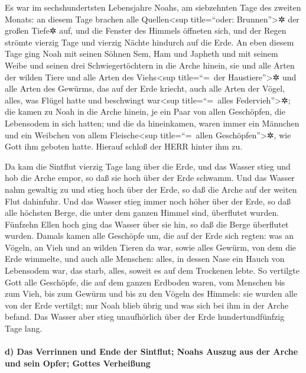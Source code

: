  Es war im sechshundertsten Lebensjahre Noahs, am
siebzehnten Tage des zweiten Monats: an diesem Tage brachen alle
Quellen\textless sup title=``oder: Brunnen''\textgreater✲ der großen
Tiefe✲ auf, und die Fenster des Himmels öffneten sich, 
und der Regen strömte vierzig Tage und vierzig Nächte hindurch auf die
Erde.  An eben diesem Tage ging Noah mit seinen Söhnen
Sem, Ham und Japheth und mit seinem Weibe und seinen drei
Schwiegertöchtern in die Arche hinein,  sie und alle
Arten der wilden Tiere und alle Arten des Viehs\textless sup
title=``=~der Haustiere''\textgreater✲ und alle Arten des Gewürms, das
auf der Erde kriecht, auch alle Arten der Vögel, alles, was Flügel hatte
und beschwingt war\textless sup title=``=~alles
Federvieh''\textgreater✲;  die kamen zu Noah in die Arche
hinein, je ein Paar von allen Geschöpfen, die Lebensodem in sich hatten;
 und die da hineinkamen, waren immer ein Männchen und ein
Weibchen von allem Fleische\textless sup title=``=~allen
Geschöpfen''\textgreater✲, wie Gott ihm geboten hatte. Hierauf schloß
der HERR hinter ihm zu.

 Da kam die Sintflut vierzig Tage lang über die Erde, und
das Wasser stieg und hob die Arche empor, so daß sie hoch über der Erde
schwamm.  Und das Wasser nahm gewaltig zu und stieg hoch
über der Erde, so daß die Arche auf der weiten Flut dahinfuhr.
 Und das Wasser stieg immer noch höher über der Erde, so
daß alle höchsten Berge, die unter dem ganzen Himmel sind, überflutet
wurden.  Fünfzehn Ellen hoch ging das Wasser über sie
hin, so daß die Berge überflutet wurden.  Damals kamen
alle Geschöpfe um, die auf der Erde sich regten: was an Vögeln, an Vieh
und an wilden Tieren da war, sowie alles Gewürm, von dem die Erde
wimmelte, und auch alle Menschen:  alles, in dessen Nase
ein Hauch von Lebensodem war, das starb, alles, soweit es auf dem
Trockenen lebte.  So vertilgte Gott alle Geschöpfe, die
auf dem ganzen Erdboden waren, vom Menschen bis zum Vieh, bis zum Gewürm
und bis zu den Vögeln des Himmels: sie wurden alle von der Erde
vertilgt; nur Noah blieb übrig und was sich bei ihm in der Arche befand.
 Das Wasser aber stieg unaufhörlich über der Erde
hundertundfünfzig Tage lang.

\hypertarget{d-das-verrinnen-und-ende-der-sintflut-noahs-auszug-aus-der-arche-und-sein-opfer-gottes-verheiuxdfung}{%
\paragraph{d) Das Verrinnen und Ende der Sintflut; Noahs Auszug aus der
Arche und sein Opfer; Gottes
Verheißung}\label{d-das-verrinnen-und-ende-der-sintflut-noahs-auszug-aus-der-arche-und-sein-opfer-gottes-verheiuxdfung}}

